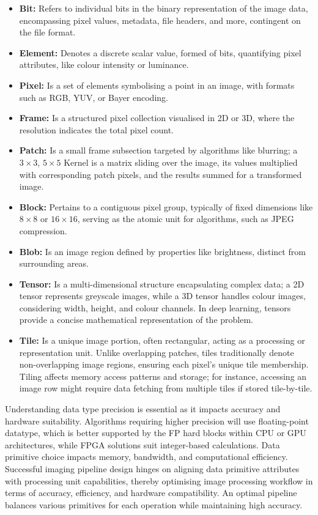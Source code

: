 \begin{itemize}
  \item \textbf{Bit:} Refers to individual bits in the binary representation of the image data, encompassing pixel values, metadata, file headers, and more, contingent on the file format.
  \item \textbf{Element:} Denotes a discrete scalar value, formed of bits, quantifying pixel attributes, like colour intensity or luminance.
  \item \textbf{Pixel:} Is a set of elements symbolising a point in an image, with formats such as RGB, YUV, or Bayer encoding.
  \item \textbf{Frame:} Is a structured pixel collection visualised in 2D or 3D, where the resolution indicates the total pixel count.
  \item \textbf{Patch:} Is a small frame subsection targeted by algorithms like blurring; a $3\times3$, $5\times5$ Kernel is a matrix sliding over the image, its values multiplied with corresponding patch pixels, and the results summed for a transformed image.
  \item \textbf{Block:} Pertains to a contiguous pixel group, typically of fixed dimensions like $8\times8$ or $16\times16$, serving as the atomic unit for algorithms, such as JPEG compression.
  \item \textbf{Blob:} Is an image region defined by properties like brightness, distinct from surrounding areas.
  \item \textbf{Tensor:} Is a multi-dimensional structure encapsulating complex data; a 2D tensor represents greyscale images, while a 3D tensor handles colour images, considering width, height, and colour channels. In deep learning, tensors provide a concise mathematical  representation of the problem.
  \item \textbf{Tile:} Is a unique image portion, often rectangular, acting as a processing or representation unit. Unlike overlapping patches, tiles traditionally denote non-overlapping image regions, ensuring each pixel's unique tile membership. Tiling affects memory access patterns and storage; for instance, accessing an image row might require data fetching from multiple tiles if stored tile-by-tile.
\end{itemize}

   

Understanding data type precision is essential as it impacts accuracy and hardware suitability. Algorithms requiring higher precision will use floating-point datatype, which is better supported by the FP hard blocks within CPU or GPU architectures, while FPGA solutions suit integer-based calculations. Data primitive choice impacts memory, bandwidth, and computational efficiency. Successful imaging pipeline design hinges on aligning data primitive attributes with processing unit capabilities, thereby optimising image processing workflow in terms of accuracy, efficiency, and hardware compatibility. An optimal pipeline balances various primitives for each operation while maintaining high accuracy.


